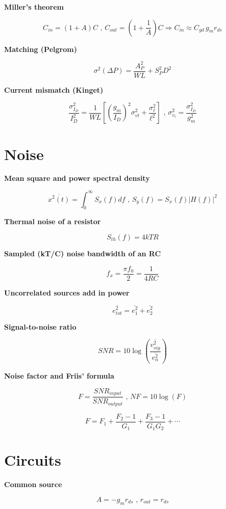 \textbf{Miller's theorem}

\[ C_{in} = (1 + A)C \text{ , } C_{out} = \left(1 + \frac{1}{A}\right)C \Rightarrow C_{in} \approx C_{gd}\, g_m r_{ds} \]

\textbf{Matching (Pelgrom)}

\[ \sigma^2(\Delta P) = \frac{A_P^2}{WL} + S_P^2 D^2 \]

\textbf{Current mismatch (Kinget)}

\[ \frac{\sigma_{I_D}^2}{I_D^2} = \frac{1}{WL}\left[\left(\frac{g_m}{I_D}\right)^2 \sigma_{vt}^2 + \frac{\sigma_{\ell}^2}{\ell^2}\right] \text{ , } \sigma_{v_i}^2 = \frac{\sigma_{I_D}^2}{g_m^2} \]

\section{Noise}\label{noise}

\textbf{Mean square and power spectral density}

\[ \overline{x^2(t)} = \int_{0}^{\infty}{S_x(f)df} \text{ , } S_y(f) = S_x(f)\vert H(f)\vert ^2 \]

\textbf{Thermal noise of a resistor}

\[ S_{th}(f) = 4kTR \]

\textbf{Sampled (kT/C) noise bandwidth of an RC}

\[ f_x = \frac{\pi f_0}{2} = \frac{1}{4RC} \]

\textbf{Uncorrelated sources add in power}

\[ \overline{e_{tot}^2} = \overline{e_{1}^2} + \overline{e_{2}^2} \]

\textbf{Signal-to-noise ratio}

\[ SNR = 10 \log\left(\frac{\overline{v_{sig}^2}}{\overline{e_{n}^2}}\right) \]

\textbf{Noise factor and Friis' formula}

\[ F = \frac{SNR_{input}}{SNR_{output}} \text{ , } NF = 10\log(F) \]

\[ F = F_1 + \frac{F_2 - 1}{G_1} + \frac{F_3 - 1}{G_1 G_2} + \cdots \]

\section{Circuits}\label{circuits}

\textbf{Common source}

\[ A = -g_m r_{ds} \text{ , } r_{out} = r_{ds} \]

